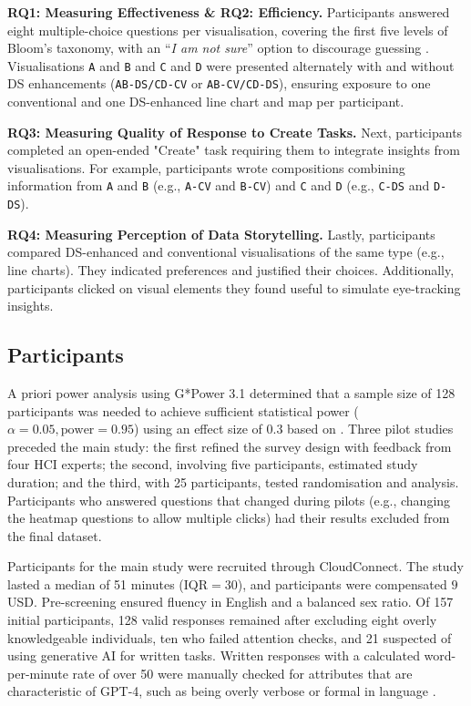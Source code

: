 \noindent \textbf{RQ1: Measuring Effectiveness \& RQ2: Efficiency.} Participants answered eight multiple-choice questions per visualisation, covering the first five levels of Bloom’s taxonomy, with an “\textit{I am not sure}” option to discourage guessing \cite{nobre2024,shao2024datastorytelling}. Visualisations \texttt{A} and \texttt{B} and \texttt{C} and \texttt{D} were presented alternately with and without DS enhancements (\texttt{AB-DS/CD-CV} or \texttt{AB-CV/CD-DS}), ensuring exposure to one conventional and one DS-enhanced line chart and map per participant. 

\noindent \textbf{RQ3: Measuring Quality of Response to Create Tasks.} Next, participants completed an open-ended "Create" task requiring them to integrate insights from visualisations. For example, participants wrote compositions combining information from \texttt{A} and \texttt{B} (e.g., \texttt{A-CV} and \texttt{B-CV}) and \texttt{C} and \texttt{D} (e.g., \texttt{C-DS} and \texttt{D-DS}).

\noindent \textbf{RQ4: Measuring Perception of Data Storytelling.} Lastly, participants compared DS-enhanced and conventional visualisations of the same type (e.g., line charts). They indicated preferences and justified their choices. Additionally, participants clicked on visual elements they found useful to simulate eye-tracking insights.

\subsection{Participants}
A priori power analysis using G*Power 3.1 determined that a sample size of 128 participants was needed to achieve sufficient statistical power ($\alpha = 0.05, \text{power} = 0.95$) using an effect size of 0.3 based on \citet{shao2024datastorytelling}. Three pilot studies preceded the main study: the first refined the survey design with feedback from four HCI experts; the second, involving five participants, estimated study duration; and the third, with 25 participants, tested randomisation and analysis. Participants who answered questions that changed during pilots (e.g., changing the heatmap questions to allow multiple clicks) had their results excluded from the final dataset.

Participants for the main study were recruited through CloudConnect. The study lasted a median of 51 minutes ($\text{IQR} = 30$), and participants were compensated $9$ USD. Pre-screening ensured fluency in English and a balanced sex ratio. Of 157 initial participants, 128 valid responses remained after excluding eight overly knowledgeable individuals, ten who failed attention checks, and 21 suspected of using generative AI for written tasks. Written responses with a calculated word-per-minute rate of over 50 \cite{dhakal2018observations} were manually checked for attributes that are characteristic of GPT-4, such as being overly verbose or formal in language \cite{kabir2024stack}.

